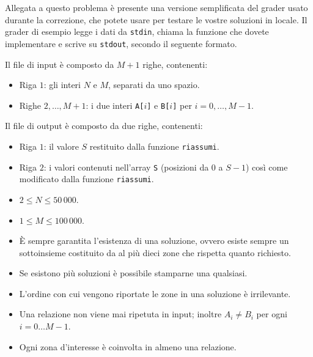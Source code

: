 \Grader
Allegata a questo problema è presente una versione semplificata del grader usato durante la correzione, che potete usare per testare le vostre soluzioni in locale. Il grader di esempio legge i dati da \texttt{stdin}, chiama la funzione che dovete implementare e scrive su \texttt{stdout}, secondo il seguente formato.

Il file di input è composto da $M+1$ righe, contenenti:
\begin{itemize}[nolistsep,itemsep=2mm]
    \item Riga $1$: gli interi $N$ e $M$, separati da uno spazio.
    \item Righe $2,\ldots, M+1$: i due interi \texttt{A[$i$]} e \texttt{B[$i$]} per $i = 0,\ldots, M-1$.
\end{itemize}

Il file di output è composto da due righe, contenenti:
\begin{itemize}[nolistsep,itemsep=2mm]
    \item Riga $1$: il valore $S$ restituito dalla funzione \texttt{riassumi}.
    \item Riga $2$: i valori contenuti nell'array \texttt{S} (posizioni da $0$ a $S-1$) così come modificato dalla funzione \texttt{riassumi}.
\end{itemize}


\Constraints

\begin{itemize}[nolistsep, itemsep=2mm]
\item $2 \le N \le 50\,000$.
\item $1 \le M \le 100\,000$.
\item È sempre garantita l'esistenza di una soluzione, ovvero esiste sempre un sottoinsieme costituito da al più dieci zone che rispetta quanto richiesto.
\item Se esistono più soluzioni è possibile stamparne una qualsiasi.
\item L'ordine con cui vengono riportate le zone in una soluzione è irrilevante.
\item Una relazione non viene mai ripetuta in input; inoltre $A_i \neq B_i$ per ogni $i = 0 \ldots M-1$.
\item Ogni zona d'interesse è coinvolta in almeno una relazione.
\end{itemize}

